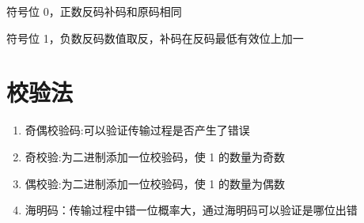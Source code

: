 符号位 0，正数反码补码和原码相同

符号位 1，负数反码数值取反，补码在反码最低有效位上加一

\section{校验法}

\begin{enumerate}

    \item 奇偶校验码:可以验证传输过程是否产生了错误
    \item 奇校验:为二进制添加一位校验码，使 1 的数量为奇数
    \item 偶校验:为二进制添加一位校验码，使 1 的数量为偶数
    \item 海明码：传输过程中错一位概率大，通过海明码可以验证是哪位出错

\end{enumerate}

\newpage

